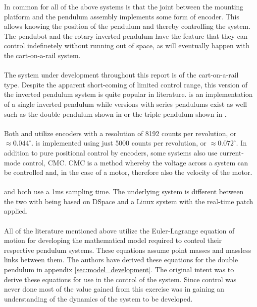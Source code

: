 In common for all of the above systems is that the joint between the mounting platform and the pendulum assembly implements some form of encoder.
This allows knowing the position of the pendulum and thereby controlling the system.
The pendubot and the rotary inverted pendulum have the feature that they can control indefinetely without running out of space, as will eventually happen with the cart-on-a-rail system.
\\~\\
The system under development throughout this report is of the cart-on-a-rail type.
Despite the apparent short-coming of limited control range, this version of the inverted pendulum system is quite popular in literature.
\cite{invertpendulum3} is an implementation of a single inverted pendulum while versions with series pendulums exist as well such as the double pendulum shown in \cite{doubleinvertpendulum} or the triple pendulum shown in \cite{tripleinvertpendulum}.
\\~\\
Both \cite{doubleinvertpendulum} and \cite{tripleinvertpendulum} utilize encoders with a resolution of 8192 counts per revolution, or $\approx 0.044^\circ$.
\cite{invertpendulum3} is implemented using just 5000 counts per revolution, or $\approx 0.072^\circ$.
In addition to pure positional control by encoders, some systems \cite{invertpendulum1} also use current-mode control, CMC.
CMC is a method whereby the voltage across a system can be controlled and, in the case of a motor, therefore also the velocity of the motor.
\\~\\
\cite{doubleinvertpendulum} and \cite{tripleinvertpendulum} both use a 1ms sampling time.
The underlying system is different between the two with \cite{tripleinvertpendulum} being based on DSpace and \cite{doubleinvertpendulum} a Linux system with the real-time patch applied.
\\~\\
All of the literature mentioned above utilize the Euler-Lagrange equation of motion for developing the mathematical model required to control their respective pendulum systems. 
These equations assume point masses and massless links between them.
The authors have derived these equations for the double pendulum in appendix \ref{sec:model_development}.
The original intent was to derive these equations for use in the control of the system.
Since control was never done most of the value gained from this exercise was in gaining an understanding of the dynamics of the system to be developed.

